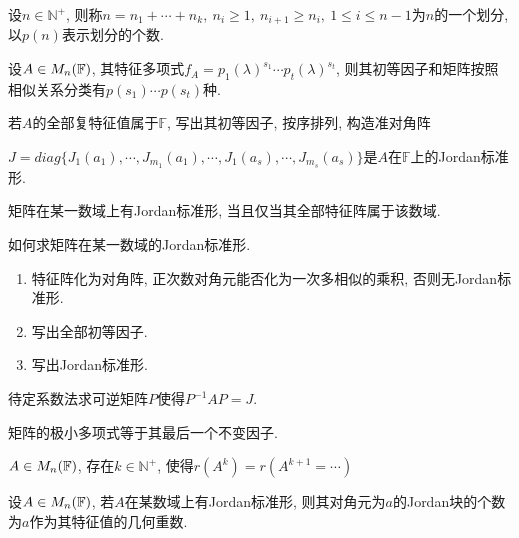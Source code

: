 \begin{definition}[正整数的划分]
    设$n\in \mathbb{N}^+$, 则称$n=n_1+\cdots+n_k,\ n_i \ge 1,\ n_{i+1}\ge n_i,\ 1\le i \le n-1$为$n$的一个划分, 以$p(n)$表示划分的个数.
\end{definition}

\begin{inference}
    设$A\in M_{n}(\mathbb{F})$, 其特征多项式$f_A=p_1(\lambda)^{s_1}\cdots p_t(\lambda)^{s_t}$, 则其初等因子和矩阵按照相似关系分类有$p(s_1)\cdots p(s_t)$种.
\end{inference}

\begin{theorem}[Jordan标准形]
    若$A$的全部复特征值属于$\mathbb{F}$, 写出其初等因子, 按序排列, 构造准对角阵\par
    $J=diag\{J_1(a_1),\cdots,J_{m_1}(a_1),\cdots,J_{1}(a_s),\cdots,J_{m_s}(a_s)\}$是$A$在$\mathbb{F}$上的Jordan标准形.\par
    矩阵在某一数域上有Jordan标准形, 当且仅当其全部特征阵属于该数域.
\end{theorem}

\begin{example}
    如何求矩阵在某一数域的Jordan标准形.\par
    \begin{enumerate}[itemindent=1em]
        \item 特征阵化为对角阵, 正次数对角元能否化为一次多相似的乘积, 否则无Jordan标准形.
        \item 写出全部初等因子.
        \item 写出Jordan标准形.
    \end{enumerate}
\end{example}


\begin{example}
    待定系数法求可逆矩阵$P$使得$P^{-1}AP=J$.
\end{example}

\begin{example}
    矩阵的极小多项式等于其最后一个不变因子.
\end{example}

\begin{example}
    $A\in M_{n}(\mathbb{F})$, 存在$k\in \mathbb{N}^+$, 使得$r(A^k)=r(A^{k+1}=\cdots)$
\end{example}

\begin{example}
    设$A\in M_{n}(\mathbb{F})$, 若$A$在某数域上有Jordan标准形, 则其对角元为$a$的Jordan块的个数为$a$作为其特征值的几何重数.
\end{example}

